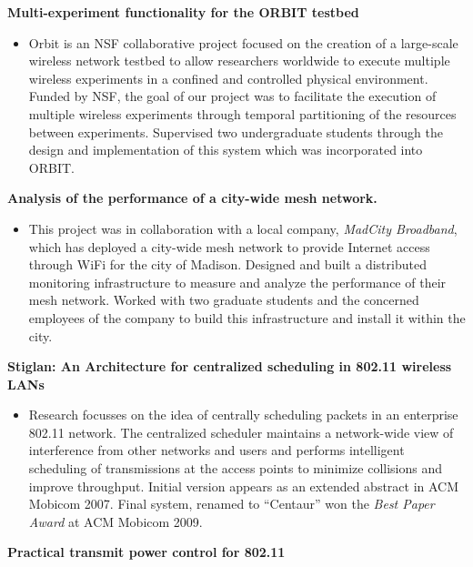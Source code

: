 \begin{resume}
{\bf Multi-experiment functionality for the ORBIT testbed}
    \begin{itemize}
	\item [] Orbit is an NSF collaborative project focused on the creation of a large-scale wireless network testbed
to allow researchers worldwide to execute  multiple wireless experiments in a
confined and controlled  physical environment.  Funded by NSF, the goal of our
project was to facilitate the execution of multiple wireless experiments
through temporal partitioning of the resources between experiments. Supervised two
undergraduate students through the design and implementation of this system
which was incorporated into ORBIT.
    \end{itemize}
\vspace{-0.2cm}
{\bf Analysis of the performance of a city-wide mesh network. }
    \begin{itemize}
	\item [] This project was in collaboration with a local company, {\it MadCity
 Broadband}, which has deployed a city-wide mesh network to provide Internet access through WiFi
for the city of Madison. Designed and built a distributed monitoring
infrastructure to measure and analyze the performance of their mesh network.
Worked with two graduate students and the concerned employees of the company to
build this infrastructure and install it within the city.
    \end{itemize}
\vspace{-0.2cm}

{\bf Stiglan: An Architecture for centralized scheduling in 802.11 wireless LANs}
    \begin{itemize}
	\item [] Research focusses on the idea of centrally scheduling packets
	in an enterprise 802.11 network. The centralized scheduler maintains a
	network-wide view of interference from other networks and users and
	performs intelligent scheduling of transmissions at the access points
	to minimize collisions and improve throughput. Initial version appears
	as an extended abstract in ACM Mobicom 2007. Final system, renamed to
	``Centaur'' won the {\em Best Paper Award} at ACM Mobicom 2009.
    \end{itemize}
\vspace{-0.2cm}

{\bf Practical transmit power control for 802.11}


\end{resume}
